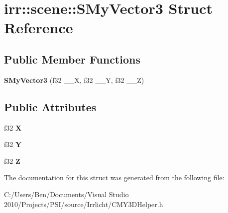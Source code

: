 \hypertarget{structirr_1_1scene_1_1_s_my_vector3}{\section{irr\-:\-:scene\-:\-:S\-My\-Vector3 Struct Reference}
\label{structirr_1_1scene_1_1_s_my_vector3}
}
\subsection*{Public Member Functions}
\begin{DoxyCompactItemize}
\item 
\hypertarget{structirr_1_1scene_1_1_s_my_vector3_a0bd03ed2eb56c83318e7c4fd54220f1c}{{\bfseries S\-My\-Vector3} (f32 \-\_\-\-\_\-\-X, f32 \-\_\-\-\_\-\-Y, f32 \-\_\-\-\_\-\-Z)}\label{structirr_1_1scene_1_1_s_my_vector3_a0bd03ed2eb56c83318e7c4fd54220f1c}

\end{DoxyCompactItemize}
\subsection*{Public Attributes}
\begin{DoxyCompactItemize}
\item 
\hypertarget{structirr_1_1scene_1_1_s_my_vector3_af941f5045526959aa00a3020583eaa1a}{f32 {\bfseries X}}\label{structirr_1_1scene_1_1_s_my_vector3_af941f5045526959aa00a3020583eaa1a}

\item 
\hypertarget{structirr_1_1scene_1_1_s_my_vector3_ae300ec7c8fe56680a5a06086318858e6}{f32 {\bfseries Y}}\label{structirr_1_1scene_1_1_s_my_vector3_ae300ec7c8fe56680a5a06086318858e6}

\item 
\hypertarget{structirr_1_1scene_1_1_s_my_vector3_a1a846b87e6becd47cea9b982b0981aa2}{f32 {\bfseries Z}}\label{structirr_1_1scene_1_1_s_my_vector3_a1a846b87e6becd47cea9b982b0981aa2}

\end{DoxyCompactItemize}


The documentation for this struct was generated from the following file\-:\begin{DoxyCompactItemize}
\item 
C\-:/\-Users/\-Ben/\-Documents/\-Visual Studio 2010/\-Projects/\-P\-S\-I/source/\-Irrlicht/C\-M\-Y3\-D\-Helper.\-h\end{DoxyCompactItemize}
